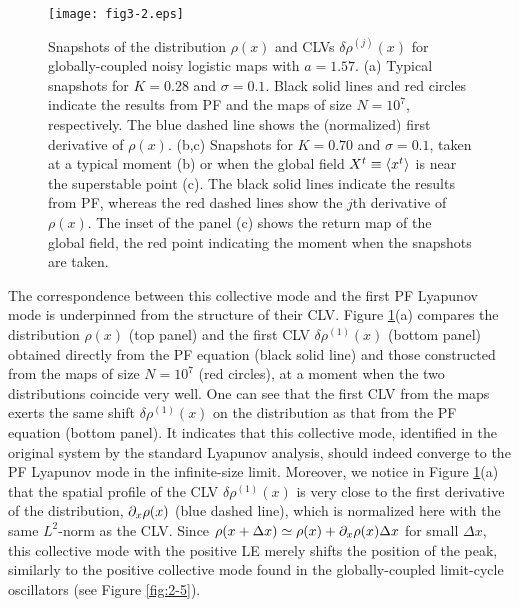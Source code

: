 \documentclass[12pt]{iopart}
\begin{document}
\begin{figure}[t]
 \begin{center}
  \texttt{[image: fig3-2.eps]}
  \caption{Snapshots of the distribution $\rho(x)$ and CLVs $\delta\rho^{(j)}(x)$ for globally-coupled noisy logistic maps  with $a=1.57$. (a) Typical snapshots for $K=0.28$ and $\sigma = 0.1$. Black solid lines and red circles indicate the results from PF and the maps of size $N=10^7$, respectively. The blue dashed line shows the (normalized) first derivative of $\rho(x)$. (b,c) Snapshots for $K=0.70$ and $\sigma = 0.1$, taken at a typical moment (b) or when the global field $X^t \equiv \langle x^t \rangle$ is near the superstable point (c). The black solid lines indicate the results from PF, whereas the red dashed lines show the $j$th derivative of $\rho(x)$. The inset of the panel (c) shows the return map of the global field, the red point indicating the moment when the snapshots are taken.}
  \label{fig:3-2}
 \end{center}
\end{figure}%

The correspondence between this collective mode
 and the first PF Lyapunov mode is underpinned
 from the structure of their CLV.
Figure \ref{fig:3-2}(a) compares the distribution $\rho(x)$ (top panel)
 and the first CLV $\delta\rho^{(1)}(x)$ (bottom panel)
 obtained directly from the PF equation (black solid line)
 and those constructed from the maps of size $N=10^7$ (red circles),
 at a moment when the two distributions coincide very well.
One can see that the first CLV from the maps exerts the same shift
 $\delta\rho^{(1)}(x)$ on the distribution as that from the PF equation
 (bottom panel).
It indicates that this collective mode,
 identified in the original system by the standard Lyapunov analysis,
 should indeed converge to the PF Lyapunov mode in the infinite-size limit.
Moreover, we notice in Figure \ref{fig:3-2}(a)
 that the spatial profile of the CLV $\delta\rho^{(1)}(x)$ is very close
 to the first derivative of the distribution, $\partial_x\rho(x)$
 (blue dashed line), which is normalized here
 with the same $L^2$-norm as the CLV.
Since $\rho(x+\Delta x) \simeq \rho(x) + \partial_x\rho(x)\Delta x$
 for small $\Delta x$, this collective mode with the positive LE
 merely shifts the position of the peak,
 similarly to the positive collective mode
 found in the globally-coupled limit-cycle oscillators
 (see Figure \ref{fig:2-5}).
\end{document}
